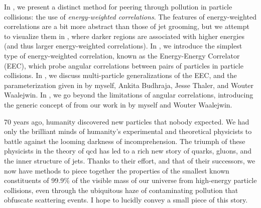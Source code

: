 In , we present a distinct method for peering through pollution in particle collisions:
%
the use of \textit{energy-weighted correlations}.
%
The features of energy-weighted correlations are a bit more abstract than those of jet grooming, but we attempt to visualize them in , where darker regions are associated with higher energies (and thus larger energy-weighted correlations).
%
In , we introduce the simplest type of energy-weighted correlation, known as the Energy-Energy Correlator (EEC), which probe angular correlations between pairs of particles in particle collisions.
%
In , we discuss multi-particle generalizations of the EEC, and the parameterization given in  by myself, Ankita Budhraja, Jesse Thaler, and Wouter Waalejwin.
%
In , we go beyond the limitations of angular correlations, introducing the generic concept of  from our work in  by myself and Wouter Waalejwin.


70 years ago, humanity discovered new particles that nobody expected.
%
We had only the brilliant minds of humanity's experimental and theoretical physicists to battle against the looming darkness of incomprehension.
%
The triumph of these physicists in the theory of \gls{qcd} has led to a rich new story of quarks, gluons, and the inner structure of jets.
%
Thanks to their effort, and that of their successors, we now have methods to piece together the properties of the smallest known constituents of 99.9\% of the visible mass of our universe from high-energy particle collisions, even through the ubiquitous haze of contaminating pollution that obfuscate scattering events.
%
I hope to lucidly convey a small piece of this story.
